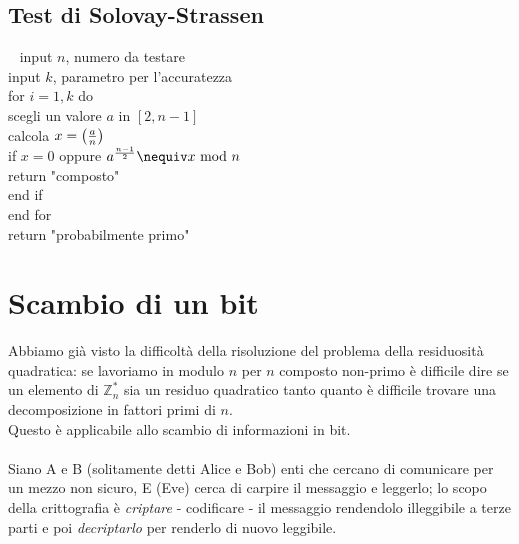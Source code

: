 	
	\section{Test di Solovay-Strassen}
	\begin{algoritmo} \ \newline
		{\selectfont
			\hspace*{10 mm} input $n$, numero da testare\\ 
			\hspace*{10 mm} input $k$, parametro per l'accuratezza\\ 
			\hspace*{10 mm} for $i=1,k$ do \\
			\hspace*{15 mm} scegli un valore $a$ in $[2,n-1]$\\
			\hspace*{15 mm} calcola $x=\left(\frac{a}{n}\right)$\\
			\hspace*{15 mm} if $x=0$ oppure $a^\frac{n-1}{2}\nequiv x \Mod n$\\
			\hspace*{20 mm} return "composto"\\
			\hspace*{15 mm} end if\\
			\hspace*{10 mm} end for\\
			\hspace*{10 mm} return "probabilmente primo"}
	\end{algoritmo}
	
	
	
	\chapter{Scambio di un bit}
	Abbiamo già visto la difficoltà della risoluzione del problema della residuosità quadratica: se lavoriamo in modulo $n$ per $n$ composto non-primo è difficile dire se un elemento di $\mathbb{Z}_n^*$ sia un residuo quadratico tanto quanto è difficile trovare una decomposizione in fattori primi di $n$. \\ Questo è applicabile allo scambio di informazioni in bit. \\ \\ Siano A e B (solitamente detti Alice e Bob) enti che cercano di comunicare per un mezzo non sicuro, E (Eve) cerca di carpire il messaggio e leggerlo; lo scopo della crittografia è \textit{criptare} - codificare - il messaggio rendendolo illeggibile a terze parti e poi \textit{decriptarlo} per renderlo di nuovo leggibile. 
	
